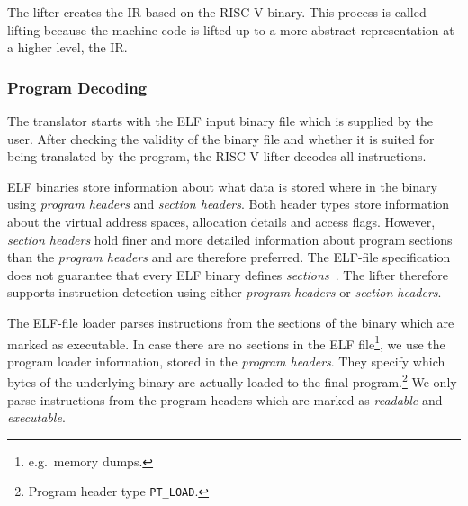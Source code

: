 \documentclass[course=eragp]{aspdoc}
\begin{document}


The lifter creates the IR based on the RISC-V binary. This process is called lifting because the
machine code is lifted up to a more abstract representation at a higher level, the IR.

\subsubsection{Program Decoding}

The translator starts with the ELF input binary file which is supplied by the user. After checking the
validity of the binary file and whether it is suited for being translated by the program, the
RISC-V lifter decodes all instructions.

\par

ELF binaries store information about what data is stored where in the binary using \textit{program
headers} and \textit{section headers}. Both header types store information about the virtual address
spaces, allocation details and access flags. However, \textit{section headers} hold finer and more detailed information
about program sections than the \textit{program headers} and are therefore preferred. The ELF-file specification does not guarantee that every ELF
binary defines \textit{sections}~\cite{elf_spec}. The lifter therefore supports instruction
detection using either \textit{program headers} or \textit{section headers}.

\par

The ELF-file loader parses instructions from the sections of the binary
which are marked as executable. In case there are no sections in the ELF file\footnote{e.g.\ memory dumps.}, we use the
program loader information, stored in the \emph{program headers}. They
specify which bytes of the underlying binary are actually loaded to the final program.\footnote{Program header type \texttt{PT\_LOAD}.}
We only parse instructions from the program headers which are marked as \emph{readable} and
\emph{executable}.
\end{document}
